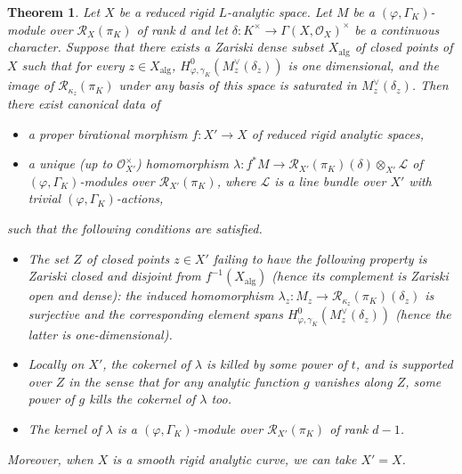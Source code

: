 \documentclass[12pt]{article}
\newtheorem{theorem}{Theorem}[subsection]
\theoremstyle{definition}
\numberwithin{equation}{theorem}
\newcommand{\calL}{\mathcal{L}}
\newcommand{\calO}{\mathcal{O}}
\newcommand{\calR}{\mathcal{R}}
\newcommand{\dual}{\vee}
\newcommand{\alg}{\mathrm{alg}}
\begin{document}
\begin{theorem}
\label{T:global triangulation step 1}
Let $X$ be a reduced rigid $L$-analytic space.
Let $M$ be a $(\varphi,\Gamma_K)$-module over $\calR_X(\pi_K)$ of rank $d$ and let $\delta: K^\times \to \Gamma(X, \calO_X)^\times$ be a continuous character.  Suppose that there exists a Zariski dense subset $X_\alg$ of closed points of $X$ such that for every $z \in X_\alg$, $H^0_{\varphi, \gamma_K}(M^\dual_z(\delta_z))$ is one dimensional, and the image of $\calR_{\kappa_z}(\pi_K)$ under any basis of this space is saturated in $M_z^\dual(\delta_z)$.  Then there exist canonical data of
\begin{itemize}
\item[(a)] a proper birational morphism $f: X' \to X$ of reduced rigid analytic spaces,
\item[(b)] a unique (up to $\calO_{X'}^\times$) homomorphism $\lambda: f^*M \to \calR_{X'}(\pi_K)(\delta) \otimes_{X'} \calL$ of $(\varphi, \Gamma_K)$-modules over $\calR_{X'}(\pi_K)$, where $\calL$ is a line bundle over $X'$ with trivial $(\varphi, \Gamma_K)$-actions,
\end{itemize}
such that the following conditions are satisfied.
\begin{itemize}
\item[(1)] The set $Z$ of closed points $z \in X'$ failing to have the following property is Zariski closed and disjoint from $f^{-1}(X_\alg)$ (hence its complement is Zariski open and dense): the induced homomorphism $\lambda_z: M_z \to \calR_{\kappa_z}(\pi_K)(\delta_z)$ is surjective and the corresponding element spans $H^0_{\varphi, \gamma_K}(M^\vee_z(\delta_z))$ (hence the latter is one-dimensional).
\item[(2)] Locally on $X'$, the cokernel of $\lambda$ is killed by some power of $t$, and is supported over $Z$ in the sense that for any analytic function $g$ vanishes along $Z$, some power of $g$ kills the cokernel of $\lambda$ too.
\item[(3)] The kernel of $\lambda$ is a $(\varphi, \Gamma_K)$-module over $\calR_{X'}(\pi_K)$ of rank $d-1$.
\end{itemize}

Moreover, when $X$ is a smooth rigid analytic curve, we can take $X'=X$.
\end{theorem}
\end{document}
